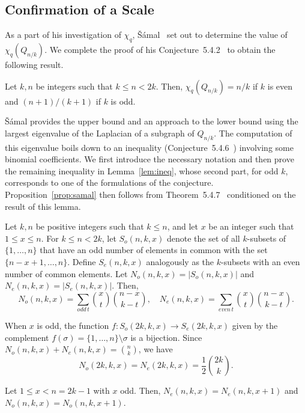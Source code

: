 \documentclass[11pt,a4paper]{article}
\begin{document}
\subsection{Confirmation of a Scale} \label{sec:pos}

As a part of his investigation of $\chi_q$, \v{S}\'{a}mal~\cite{samal:06}
set out to determine the value of $\chi_q(Q_{n/k})$.
We complete the proof of his Conjecture~5.4.2~\cite{samal:06}
to obtain the following result.
\begin{proposition} \label{prop:samal}
  Let $k, n$ be integers such that $k \leq n < 2k$.
  Then, 
$\chi_q(Q_{n/k}) = 
n/k$ if $k$ is even and $(n+1)/(k+1)$ if $k$ is odd. \end{proposition}
\v{S}\'{a}mal provides the upper bound and an approach to the lower bound 
using the largest eigenvalue of the Laplacian of a subgraph of $Q_{n/k}$.
The computation of this eigenvalue
boils down to an inequality (Conjecture~5.4.6~\cite{samal:06})
involving some binomial coefficients.
We first introduce the necessary notation and then prove the remaining
inequality in Lemma~\ref{lem:ineq}, whose second part, for odd $k$,
corresponds to one of the formulations of the conjecture.
Proposition~\ref{prop:samal} then follows from
Theorem~5.4.7~\cite{samal:06} conditioned on the result of this lemma.

  Let $k, n$ be positive integers such that $k \leq n$, and let
  $x$ be an integer such that $1 \leq x \leq n$.
  For $k \leq n < 2k$, let $S_o(n,k,x)$ denote the set of all $k$-subsets of $\{1, \ldots, n\}$ that have an odd number of elements in common with the set $\{n-x+1, \ldots, n\}$.
  Define $S_e(n,k,x)$ analogously as the $k$-subsets with an even number of common elements.
  Let $N_o(n,k,x) = |S_o(n,k,x)|$ and $N_e(n,k,x) = |S_e(n,k,x)|$. Then, \begin{equation}
  N_o(n,k,x) = \sum_{odd \, t} \binom{x}{t} \binom{n-x}{k-t}, \quad
  N_e(n,k,x) = \sum_{even \, t} \binom{x}{t} \binom{n-x}{k-t}.
  \end{equation}


  When $x$ is odd, the function $f : S_o(2k,k,x) \rightarrow S_e(2k,k,x)$
  given by the complement $f(\sigma) = \{1, \ldots, n\} \setminus \sigma$
  is a bijection.
  Since $N_o(n,k,x)+N_e(n,k,x) = \binom{n}{k}$, we have
  \begin{equation} \label{eqn:1}
    N_o(2k,k,x) = N_e(2k,k,x) = \frac{1}{2} \binom{2k}{k}.
  \end{equation}
  

  \begin{lemma} \label{lem:help}
    Let $1 \leq x < n = 2k-1$ with $x$ odd. Then,
    $N_e(n,k,x) = N_e(n,k,x+1)$ and $N_o(n,k,x) = N_o(n,k,x+1)$.
  \end{lemma}
\end{document}
